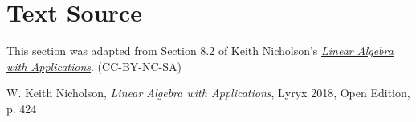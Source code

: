 \documentclass{ximera}
\begin{document}
\section*{Text Source} This section was adapted from Section 8.2 of Keith Nicholson's \href{https://open.umn.edu/opentextbooks/textbooks/linear-algebra-with-applications}{\it Linear Algebra with Applications}. (CC-BY-NC-SA)

W. Keith Nicholson, {\it Linear Algebra with Applications}, Lyryx 2018, Open Edition, p. 424
\end{document}
